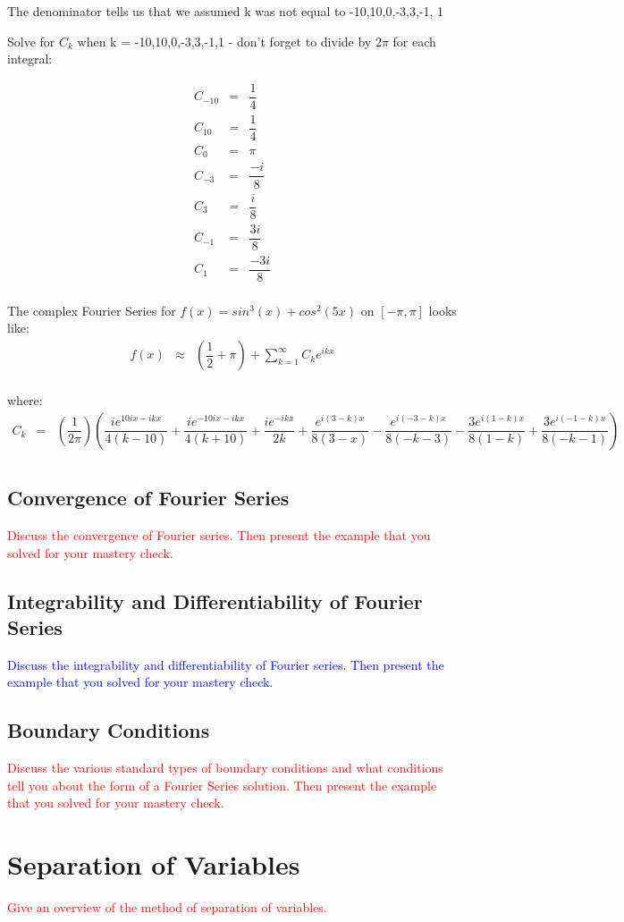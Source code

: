 \documentclass{article}
\newcommand{\bea}{\begin{eqnarray*}}
\newcommand{\eea}{\end{eqnarray*}}
\newcommand{\red}[1]{\textcolor{red}{#1}}
\newcommand{\blue}[1]{\textcolor{blue}{#1}}
\begin{document}
The denominator tells us that we assumed k was not equal to -10,10,0,-3,3,-1, 1\newline

Solve for $C_k$ when k = -10,10,0,-3,3,-1,1 - don't forget to divide by $2\pi$ for each integral:\newline

\bea
C_{-10} &=& \dfrac{1}{4} \\
C_10 &=& \dfrac{1}{4} \\
C_0 &=& \pi \\
C_{-3} &=& \dfrac{-i}{8} \\
C_3 &=& \dfrac{i}{8}\\
C_{-1} &=& \dfrac{3i}{8} \\
C_1 &=& \dfrac{-3i}{8}\\
\eea

The complex Fourier Series for $f(x) = sin^3(x)+cos^2(5x)$ on $[-\pi,\pi]$ looks like:
\bea
f(x) &\approx& (\dfrac{1}{2}+\pi) + \sum_{k=1}^{\infty} C_ke^{ikx} \\
\eea

where:
\bea
C_k &=& (\dfrac{1}{2\pi})(\dfrac{ie^{10ix-ikx}}{4(k-10)} + \dfrac{ie^{-10ix-ikx}}{4(k+10)} + \dfrac{ie^{-ikx}}{2k} + \dfrac{e^{i(3-k)x}}{8(3-x)} - \dfrac{e^{i(-3-k)x}}{8(-k-3)} - \dfrac{3e^{i(1-k)x}}{8(1-k)} + \dfrac{3e^{i(-1-k)x}}{8(-k-1)}) \\
\eea


\subsection{Convergence of Fourier Series}
\red{Discuss the convergence of Fourier series. Then present the example that you solved for your mastery check.}
\subsection{Integrability and Differentiability of Fourier Series}
\blue{Discuss the integrability and differentiability of Fourier series. Then present the example that you solved for your mastery check.}
\subsection{Boundary Conditions}
\red{Discuss the various standard types of boundary conditions and what conditions tell you about the form of a Fourier Series solution. Then present the example that you solved for your mastery check.}
\section{Separation of Variables}
\red{Give an overview of the method of separation of variables.}
\end{document}
